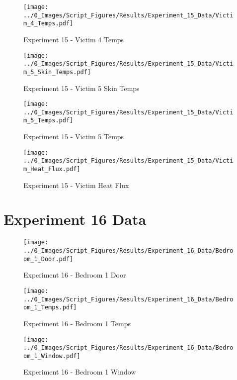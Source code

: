	\clearpage

	\begin{figure}[H]
		\centering
		\texttt{[image: ../0\_Images/Script\_Figures/Results/Experiment\_15\_Data/Victim\_4\_Temps.pdf]}
		\caption[]{Experiment 15 - Victim 4 Temps}
	\end{figure}
 

	\begin{figure}[H]
		\centering
		\texttt{[image: ../0\_Images/Script\_Figures/Results/Experiment\_15\_Data/Victim\_5\_Skin\_Temps.pdf]}
		\caption[]{Experiment 15 - Victim 5 Skin Temps}
	\end{figure}
 
	\clearpage

	\begin{figure}[H]
		\centering
		\texttt{[image: ../0\_Images/Script\_Figures/Results/Experiment\_15\_Data/Victim\_5\_Temps.pdf]}
		\caption[]{Experiment 15 - Victim 5 Temps}
	\end{figure}
 

	\begin{figure}[H]
		\centering
		\texttt{[image: ../0\_Images/Script\_Figures/Results/Experiment\_15\_Data/Victim\_Heat\_Flux.pdf]}
		\caption[]{Experiment 15 - Victim Heat Flux}
	\end{figure}
 
	\clearpage

\clearpage		\large
\section{Experiment 16 Data} \label{App:Exp16Results} 

	\begin{figure}[H]
		\centering
		\texttt{[image: ../0\_Images/Script\_Figures/Results/Experiment\_16\_Data/Bedroom\_1\_Door.pdf]}
		\caption[]{Experiment 16 - Bedroom 1 Door}
	\end{figure}
 

	\begin{figure}[H]
		\centering
		\texttt{[image: ../0\_Images/Script\_Figures/Results/Experiment\_16\_Data/Bedroom\_1\_Temps.pdf]}
		\caption[]{Experiment 16 - Bedroom 1 Temps}
	\end{figure}
 
	\clearpage

	\begin{figure}[H]
		\centering
		\texttt{[image: ../0\_Images/Script\_Figures/Results/Experiment\_16\_Data/Bedroom\_1\_Window.pdf]}
		\caption[]{Experiment 16 - Bedroom 1 Window}
	\end{figure}
 

